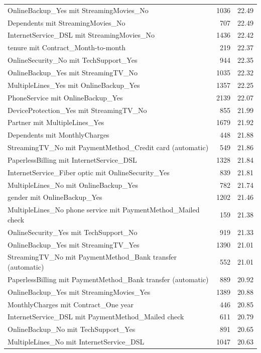 \documentclass[a4paper,11pt]{article}
\begin{document}
\begin{longtable}{p{9cm}rr}
OnlineBackup\_Yes mit StreamingMovies\_No & 1036 & 22.49 \\
Dependents mit StreamingMovies\_No & 707 & 22.49 \\
InternetService\_DSL mit StreamingMovies\_No & 1436 & 22.42 \\
tenure mit Contract\_Month-to-month & 219 & 22.37 \\
OnlineSecurity\_No mit TechSupport\_Yes & 944 & 22.35 \\
OnlineBackup\_Yes mit StreamingTV\_No & 1035 & 22.32 \\
MultipleLines\_Yes mit OnlineBackup\_Yes & 1357 & 22.25 \\
PhoneService mit OnlineBackup\_Yes & 2139 & 22.07 \\
DeviceProtection\_Yes mit StreamingTV\_No & 855 & 21.99 \\
Partner mit MultipleLines\_Yes & 1679 & 21.92 \\
Dependents mit MonthlyCharges & 448 & 21.88 \\
StreamingTV\_No mit PaymentMethod\_Credit card (automatic) & 549 & 21.86 \\
PaperlessBilling mit InternetService\_DSL & 1328 & 21.84 \\
InternetService\_Fiber optic mit OnlineSecurity\_Yes & 839 & 21.81 \\
MultipleLines\_No mit OnlineBackup\_Yes & 782 & 21.74 \\
gender mit OnlineBackup\_Yes & 1202 & 21.46 \\
MultipleLines\_No phone service mit PaymentMethod\_Mailed check & 159 & 21.38 \\
OnlineSecurity\_Yes mit TechSupport\_No & 919 & 21.33 \\
OnlineBackup\_Yes mit StreamingTV\_Yes & 1390 & 21.01 \\
StreamingTV\_No mit PaymentMethod\_Bank transfer (automatic) & 552 & 21.01 \\
PaperlessBilling mit PaymentMethod\_Bank transfer (automatic) & 889 & 20.92 \\
OnlineBackup\_Yes mit StreamingMovies\_Yes & 1389 & 20.88 \\
MonthlyCharges mit Contract\_One year & 446 & 20.85 \\
InternetService\_DSL mit PaymentMethod\_Mailed check & 611 & 20.79 \\
OnlineBackup\_No mit TechSupport\_Yes & 891 & 20.65 \\
MultipleLines\_No mit InternetService\_DSL & 1047 & 20.63 \\

\end{longtable}
\end{document}
